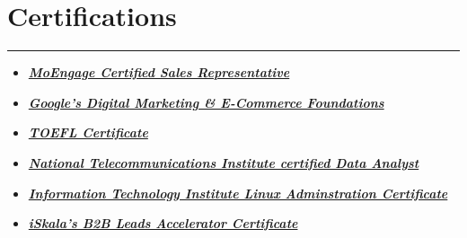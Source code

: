 \documentclass[10pt]{article}
\newcommand{\fancy}[1]{\Large\textbf{\textit{#1}}}
\begin{document}
\vspace{2em}

\section*{Certifications}
\hrule
\vspace{1em}
\begin{itemize}
	\item \fancy{\href{https://drive.google.com/file/d/1oVheSzrBrTLYeBn-ZG-hy3XyhJtFHgcd/view?usp=sharing}{MoEngage Certified Sales Representative} \quad\quad}
	\item \fancy{\href{https://drive.google.com/file/d/1955TZraJBMhCvt817PJTLI1tr5zcAoqw/view?usp=sharing}{Google's Digital Marketing \& E-Commerce Foundations} \quad\quad}
	\item \fancy{\href{https://drive.google.com/file/d/1S9nyRJj5tY12hFw3_XthDpG-YLtbXHaj/view?usp=sharing}{TOEFL Certificate} \quad\quad}
	\item \fancy{\href{https://drive.google.com/file/d/10bVSdgmst6n0jzUPkGVonB4aUQ1BVtyA/view?usp=sharing}{National Telecommunications Institute certified Data Analyst}}
	\item \fancy{\href{https://drive.google.com/file/d/1WcM3YUQOT4w0M9fh1rSaY6zbrRgl6hi6/view?usp=sharing}{Information Technology Institute Linux Adminstration Certificate}}
	\item \fancy{\href{https://drive.google.com/file/d/1UHhuuMiArMW_1hM4Z_n6Jjeq9fMcX5iZ/view?usp=sharing}{iSkala's B2B Leads Accelerator Certificate} \quad\quad}
\end{itemize}

\vspace{1em}
\end{document}
